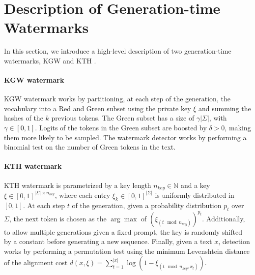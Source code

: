 \section{Description of Generation-time Watermarks}
\label{app:sampling_based_wm}

In this section, we introduce a high-level description of two generation-time watermarks, \textsc{KGW} \citep{kgw} and \textsc{KTH} \citep{stanford}. 

\paragraph{KGW watermark}
\textsc{KGW} watermark \citep{kgw} works by partitioning, at each step of the generation, the vocabulary into a Red and Green subset using the private key $\xi$ and summing the hashes of the $k$ previous tokens.  
The Green subset has a size of $\gamma |\Sigma|$, with $\gamma \in [0,1]$.  
Logits of the tokens in the Green subset are boosted by $\delta > 0$, making them more likely to be sampled.  
The watermark detector works by performing a binomial test on the number of Green tokens in the text.  

\paragraph{KTH watermark}
\textsc{KTH} watermark \citep{stanford} is parametrized by a key length $n_{key} \in \mathbb{N}$ and a key $\xi \in [0,1]^{|\Sigma| \times n_{key}}$, where each entry $\xi_k \in [0,1]^{|\Sigma|}$ is uniformly distributed in $[0,1]$.
At each step $t$ of the generation, given a probability distribution $p_t$ over $\Sigma$, the next token is chosen as the $\arg\max$ of $(\xi_{(t \mod n_{key})})^{p_t}$.
Additionally, to allow multiple generations given a fixed prompt, the key is randomly shifted by a constant before generating a new sequence.
Finally, given a text $x$, detection works by performing a permutation test using the minimum Levenshtein distance of the alignment cost $d(x, \xi) = \sum_{t=1}^{|x|} \log(1 - \xi_{(t \mod n_{key}, x_t)})$.
